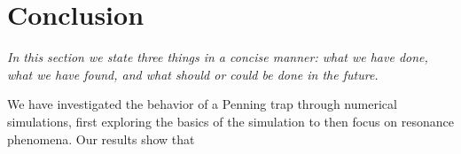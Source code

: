 \documentclass[english,notitlepage,reprint,nofootinbib]{revtex4-1}  %
\begin{document}
\section{Conclusion}\label{sec:conclusion}
\textit{In this section we state three things in a concise manner: what we have done, what we have found, and what should or could be done in the future.}

We have investigated the behavior of a Penning trap through numerical simulations, first exploring the basics of the simulation to then focus on
resonance phenomena. Our results show that
\onecolumngrid

%

\end{document}
